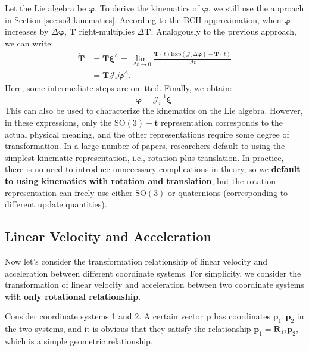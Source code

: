 Let the Lie algebra be $\boldsymbol{\varphi}$. To derive the kinematics of $\boldsymbol{\varphi}$, we still use the approach in Section \ref{sec:so3-kinematics}. According to the BCH approximation, when $\boldsymbol{\varphi}$ increases by $\Delta \boldsymbol{\varphi}$, $\mathbf{T}$
right-multiplies $\Delta \mathbf{T}$. Analogously to the previous approach, we can write:
\begin{align}\label{key}
	\dot{\mathbf{T}} &= \mathbf{T} \boldsymbol{\xi}^\wedge = \mathop {\lim }\limits_{\Delta t \to 0} 
	\frac{{\mathbf{T}\left( t \right)\mathrm{Exp}\left( {{\mathbf{\mathcal{J}}_r}\Delta \boldsymbol{\varphi} } 
			\right) - \mathbf{T}\left( t \right)}}{{\Delta t}} \\
	& = \mathbf{T} \mathbf{\mathcal{J}}_r \dot{\boldsymbol{\varphi}}^\wedge .
\end{align}
Here, some intermediate steps are omitted. Finally, we obtain:
\begin{equation}\label{key}
	\dot{\boldsymbol{\varphi}} = \boldsymbol{\mathcal{J}}_r^{-1} \boldsymbol{\xi}.
\end{equation}
This can also be used to characterize the kinematics on the Lie algebra. However, in these expressions, only the $\mathrm{SO}(3) + \mathbf{t}$ representation corresponds to the actual physical meaning, and the other representations require some degree of transformation. In a large number of papers, researchers default to using the simplest kinematic representation, i.e., rotation plus translation. In practice, there is no need to introduce unnecessary complications in theory, so we \textbf{default to using kinematics with rotation and translation}, but the rotation representation can freely use either $\mathrm{SO}(3)$ or quaternions (corresponding to different update quantities).

\subsection{Linear Velocity and Acceleration}
Now let's consider the transformation relationship of linear velocity and acceleration between different coordinate systems. For simplicity, we consider the transformation of linear velocity and acceleration between two coordinate systems with \textbf{only rotational relationship}.

Consider coordinate systems 1 and 2. A certain vector $\mathbf{p}$ has coordinates $\mathbf{p}_1, \mathbf{p}_2$ in the two systems, and it is obvious that they satisfy the relationship $\mathbf{p}_1 = \mathbf{R}_{12} \mathbf{p}_2$, which is a simple geometric relationship.

